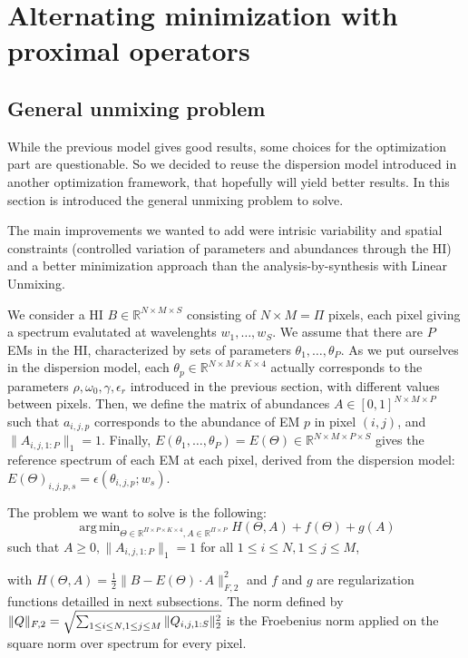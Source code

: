 \documentclass[conference]{IEEEtran}
\DeclareMathOperator*{\argmin}{arg\,min}
\begin{document}
\section{Alternating minimization with proximal operators}
\subsection{General unmixing problem}

While the previous model gives good results, some choices for the optimization part are questionable. So we decided to reuse the dispersion model introduced in another optimization framework, that hopefully will yield better results. In this section is introduced the general unmixing problem to solve.

The main improvements we wanted to add were intrisic variability and spatial constraints (controlled variation of parameters and abundances through the HI) and a better minimization approach than the analysis-by-synthesis with Linear Unmixing.

We consider a HI $B \in \mathbb{R}^{N \times M \times S}$ consisting of $N \times M = \Pi$ pixels, each pixel giving a spectrum evalutated at wavelenghts $w_1,\dots, w_S$. We assume that there are $P$ EMs in the HI, characterized by sets of parameters $\theta_1,\dots, \theta_P$. As we put ourselves in the dispersion model, each $\theta_p \in \mathbb{R}^{N \times M \times K \times 4}$ actually corresponds to the parameters $\rho, \omega_0, \gamma, \epsilon_r$ introduced in the previous section, with different values between pixels. Then, we define the matrix of abundances $A \in [0, 1]^{N \times M\times P}$ such that $a_{i, j, p}$ corresponds to the abundance of EM $p$ in pixel $(i, j)$, and $\|A_{i, j, 1:P}\|_1 = 1$. Finally, $E(\theta_1,\dots, \theta_P) = E(\Theta) \in \mathbb{R}^{N \times M \times P \times S}$ gives the reference spectrum of each EM at each pixel, derived from the dispersion model: $E(\Theta)_{i, j, p, s} = \epsilon(\theta_{i, j, p}; w_s)$.

The problem we want to solve is the following:
\begin{equation}
  \label{eq:gen}
  \argmin_{\Theta \in \mathbb{R}^{\Pi \times P \times K \times 4}, A \in \mathbb{R}^{\Pi \times P}} H(\Theta, A) + f(\Theta) + g(A)
\end{equation}
such that $A \geq 0, \|A_{i, j, 1:P}\|_1 = 1$ for all $1\leq i \leq N, 1\leq j \leq M$, 

with $H(\Theta, A) = \frac{1}{2} \|B - E(\Theta) \cdot A\|_{F, 2}^2$ and $f$ and $g$ are regularization functions detailled in next subsections. The norm defined by $\|Q\|_{F, 2} = \sqrt{\sum_{1 \leq i \leq N,\\1 \leq j \leq M} \|Q_{i, j, 1:S}\|_2^2}$ is the Froebenius norm applied on the square norm over spectrum for every pixel.
\end{document}
